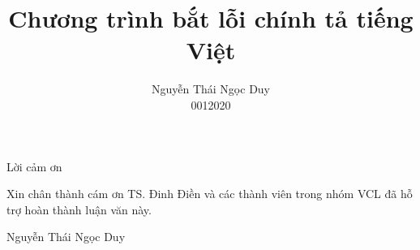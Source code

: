 \documentclass[a4paper,oneside,14pt]{extbook} %
\title{Chương trình bắt lỗi chính tả tiếng Việt}
\author{Nguyễn Thái Ngọc Duy\\0012020}
\begin{document}
\dominitoc
\maketitle

\begin{titlepage}
  \begin{center}
    \Large Lời cảm ơn
  \end{center}
  Xin chân thành cám ơn TS. Đinh Điền và các thành viên trong nhóm VCL
  đã hỗ trợ hoàn thành luận văn này.
\begin{flushright}
  Nguyễn Thái Ngọc Duy
\end{flushright}
\end{titlepage}

\tableofcontents
\listoffigures
\listoftables
{}






















\end{document}
